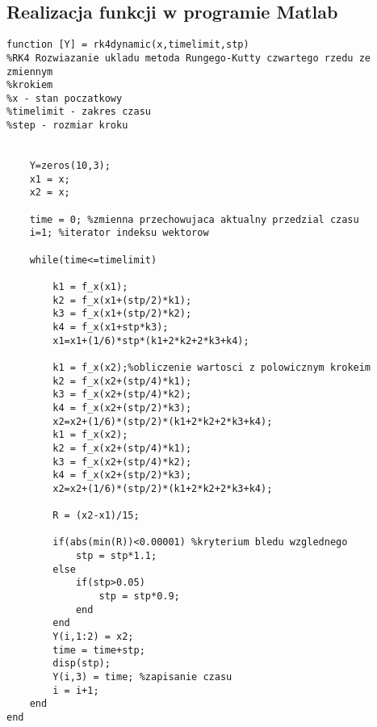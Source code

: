 \documentclass[a4paper, 11pt]{article}
\begin{document}
\subsection{Realizacja funkcji w programie Matlab}
\begin{lstlisting}
function [Y] = rk4dynamic(x,timelimit,stp)
%RK4 Rozwiazanie ukladu metoda Rungego-Kutty czwartego rzedu ze zmiennym
%krokiem
%x - stan poczatkowy
%timelimit - zakres czasu
%step - rozmiar kroku

    
    Y=zeros(10,3);
    x1 = x;
    x2 = x;
    
    time = 0; %zmienna przechowujaca aktualny przedzial czasu
    i=1; %iterator indeksu wektorow

    while(time<=timelimit)
        
        k1 = f_x(x1);
        k2 = f_x(x1+(stp/2)*k1);
        k3 = f_x(x1+(stp/2)*k2);
        k4 = f_x(x1+stp*k3); 
        x1=x1+(1/6)*stp*(k1+2*k2+2*k3+k4);

        k1 = f_x(x2);%obliczenie wartosci z polowicznym krokeim
        k2 = f_x(x2+(stp/4)*k1);
        k3 = f_x(x2+(stp/4)*k2);
        k4 = f_x(x2+(stp/2)*k3);
        x2=x2+(1/6)*(stp/2)*(k1+2*k2+2*k3+k4);
        k1 = f_x(x2);
        k2 = f_x(x2+(stp/4)*k1);
        k3 = f_x(x2+(stp/4)*k2);
        k4 = f_x(x2+(stp/2)*k3);
        x2=x2+(1/6)*(stp/2)*(k1+2*k2+2*k3+k4);  
        
        R = (x2-x1)/15;
        
        if(abs(min(R))<0.00001) %kryterium bledu wzglednego  
            stp = stp*1.1;
        else
            if(stp>0.05)
                stp = stp*0.9;
            end
        end
        Y(i,1:2) = x2;
        time = time+stp; 
        disp(stp); 
        Y(i,3) = time; %zapisanie czasu
        i = i+1; 
    end
end

\end{lstlisting}
\end{document}
